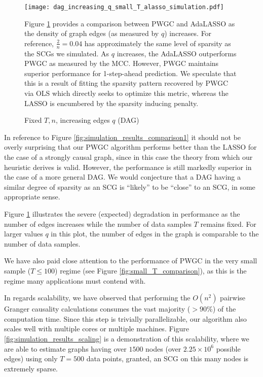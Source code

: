 \documentclass{statsoc}
\begin{document}
\begin{figure}
  \caption{Fixed $T, n$, increasing edges $q$ (DAG)}
  \label{fig:simulation_results_dense}
  \texttt{[image: dag\_increasing\_q\_small\_T\_alasso\_simulation.pdf]}

  {\footnotesize Figure \ref{fig:simulation_results_dense} provides a
    comparison between PWGC and AdaLASSO as the density of graph edges
    (as measured by $q$) increases.  For reference,
    $\frac{2}{n} = 0.04$ has approximately the same level of sparsity
    as the SCGs we simulated.  As $q$ increases, the AdaLASSO
    outperforms PWGC as measured by the MCC.  However, PWGC maintains
    superior performance for 1-step-ahead prediction.  We speculate
    that this is a result of fitting the sparsity pattern recovered by
    PWGC via OLS which directly seeks to optimize this metric, whereas
    the LASSO is encumbered by the sparsity inducing penalty.}
\end{figure}

In reference to Figure \ref{fig:simulation_results_comparison1} it
should not be overly surprising that our PWGC algorithm performs
better than the LASSO for the case of a strongly causal graph, since
in this case the theory from which our heuristic derives is valid.
However, the performance is still markedly superior in the case of a
more general DAG.  We would conjecture that a DAG having a similar
degree of sparsity as an SCG is ``likely'' to be ``close'' to an SCG,
in some appropriate sense.

Figure \ref{fig:simulation_results_dense} illustrates the severe
(expected) degradation in performance as the number of edges increases
while the number of data samples $T$ remains fixed.  For larger values
$q$ in this plot, the number of edges in the graph is comparable to
the number of data samples.

We have also paid close attention to the performance of PWGC in the
very small sample ($T \le 100$) regime (see Figure
\ref{fig:small_T_comparison}), as this is the regime many applications
must contend with.

In regards scalability, we have observed that performing the $O(n^2)$
pairwise Granger causality calculations consumes the vast majority
($> 90\%$) of the computation time.  Since this step is trivially
parallelizable, our algorithm also scales well with multiple cores or
multiple machines.  Figure \ref{fig:simulation_results_scaling} is a
demonstration of this scalability, where we are able to estimate
graphs having over $1500$ nodes (over $2.25 \times 10 ^6$ possible edges)
using only $T = 500$ data points, granted, an SCG on this many nodes
is extremely sparse.

\clearpage

\end{document}

